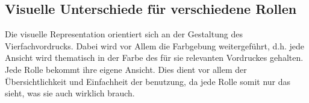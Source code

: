 \subsection{Visuelle Unterschiede für verschiedene Rollen}
Die visuelle Representation orientiert sich an der Gestaltung des Vierfachvordrucks. Dabei wird vor Allem die Farbgebung weitergeführt,   
d.h. jede Ansicht wird thematisch in der Farbe des für sie relevanten Vordruckes gehalten. Jede Rolle bekommt ihre eigene Ansicht.  
Dies dient vor allem der Übersichtlichkeit und Einfachheit der benutzung, da jede Rolle somit nur das sieht, was sie auch wirklich brauch.  

